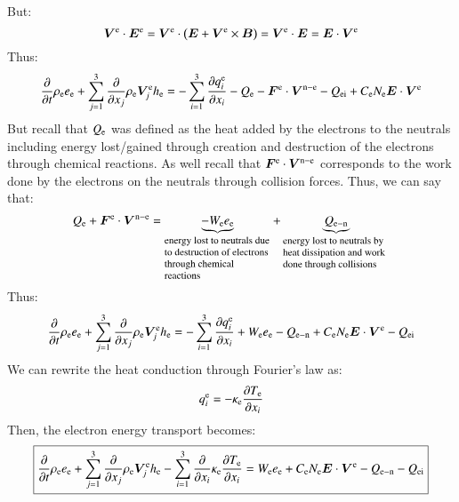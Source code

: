 \documentclass{warpdoc}
\newcommand\frameeqn[1]{\fbox{$\displaystyle #1$}}
\renewcommand{\vec}[1]{\bm{#1}}
\begin{document}
%  
But:
%
\begin{equation}
\vec{V}^{\rm e} \cdot \vec{E}^{\rm e} =
\vec{V}^{\rm e} \cdot \left( \vec{E}+\vec{V}^{\rm e} \times \vec{B}\right)
= \vec{V}^{\rm e} \cdot \vec{E}
=   \vec{E}\cdot \vec{V}^{\rm e}
\end{equation}
%
Thus:
%
\begin{equation}
 \frac{\partial }{\partial t}\rho_{\rm e} e_{\rm e} + \sum_{j=1}^3  \frac{\partial }{\partial x_j} \rho_{\rm e} \vec{V}^{\rm e}_j h_{\rm e} 
= 
-\sum_{i=1}^{3}\frac{\partial q_i^{\rm e}}{\partial x_i}
- Q_{{\rm e}}
- \vec{F}^{\rm e}\cdot  \vec{V}^{{\rm n}-{\rm e}} 
- Q_{\rm ei}
+   C_{\rm e} N_{\rm e} \vec{E} \cdot \vec{V}^{\rm e}  
\end{equation}
%  
But recall that $Q_{\rm e}$ was defined as the heat added by the electrons to the neutrals including energy lost/gained through creation and destruction of the electrons through chemical reactions. As well recall that $\vec{F}^{\rm e}\cdot  \vec{V}^{{\rm n}-{\rm e}}$ corresponds to the work done by the electrons on the neutrals through collision forces. Thus, we can say that:
%
\begin{equation}
Q_{{\rm e}}
+ \vec{F}^{\rm e}\cdot  \vec{V}^{{\rm n}-{\rm e}}=\underbrace{-W_{\rm e} e_{\rm e}}_{\begin{minipage}{3cm} \footnotesize \flushleft energy lost to neutrals due to destruction of electrons through chemical reactions\end{minipage}}
+
\underbrace{Q_{\rm e-n} }_{\begin{minipage}{3cm} \footnotesize \flushleft energy lost to neutrals by heat dissipation and work done through collisions\end{minipage}}
\end{equation}
%
Thus:
%
\begin{equation}
 \frac{\partial }{\partial t}\rho_{\rm e} e_{\rm e} + \sum_{j=1}^3  \frac{\partial }{\partial x_j} \rho_{\rm e} \vec{V}^{\rm e}_j h_{\rm e} 
= 
-\sum_{i=1}^{3}\frac{\partial q_i^{\rm e}}{\partial x_i}
+ W_{\rm e} e_{\rm e}
- Q_{\rm e-n}
+   C_{\rm e} N_{\rm e} \vec{E} \cdot \vec{V}^{\rm e}  
- Q_{\rm ei}
\end{equation}
%  
We can rewrite the heat conduction through Fourier's law as:
%
\begin{equation}
  q_i^{\rm e}=-\kappa_{\rm e} \frac{\partial T_{\rm e}}{\partial x_i}
\end{equation}
%
Then, the electron energy transport becomes:
%
\begin{equation}
\frameeqn{
 \frac{\partial }{\partial t}\rho_{\rm e} e_{\rm e} + \sum_{j=1}^3  \frac{\partial }{\partial x_j} \rho_{\rm e} \vec{V}^{\rm e}_j h_{\rm e} 
-\sum_{i=1}^{3}\frac{\partial }{\partial x_i}\kappa_{\rm e}\frac{\partial T_{\rm e}}{\partial x_i}
= 
 W_{\rm e} e_{\rm e}
+   C_{\rm e} N_{\rm e} \vec{E} \cdot \vec{V}^{\rm e}  
- Q_{\rm e-n}
- Q_{\rm ei}
}
\label{eqn:eenergy}
\end{equation}
\end{document}
